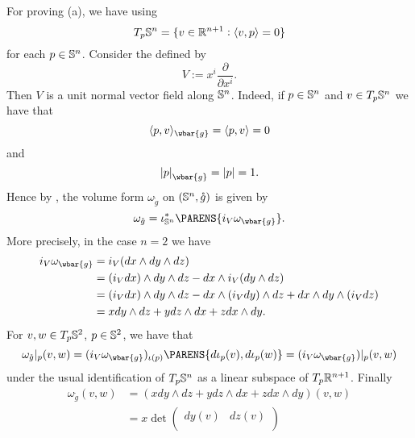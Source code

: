 \begin{solution}
	For proving (a), we have using \cite[117]{lee:smooth_manifolds:2013}
	\begin{equation*}
		T_p\Sbb^n = \cbr[0]{v \in \Rbb^{n + 1} : \langle v,p \rangle = 0}
	\end{equation*}
	\noindent for each $p \in \mathbb{S}^n$. Consider the  defined by
	\begin{equation*}
		V := x^i \frac{\partial}{\partial x^i}.
	\end{equation*}
	Then $V$ is a unit normal vector field along $\mathbb{S}^n$. Indeed, if $p \in \mathbb{S}^n$ and $v \in T_p\mathbb{S}^n$ we have that 
	\begin{equation*}
		\langle p,v \rangle_{\wbar{g}} = \langle p,v \rangle = 0
	\end{equation*}
	\noindent and
	\begin{equation*}
		\abs[0]{p}_{\wbar{g}} = \abs[0]{p} = 1.
	\end{equation*}
	Hence by \cite[390]{lee:smooth_manifolds:2013}, the volume form $\omega_{\mathring{g}}$ on $(\mathbb{S}^n,\mathring{g})$ is given by
	\begin{equation*}
		\omega_{\mathring{g}} = \iota_{\Sbb^n}^*\PARENS{i_V\omega_{\wbar{g}}}.
	\end{equation*}
	More precisely, in the case $n = 2$ we have
	\begin{align*}
		i_V\omega_{\wbar{g}} &= i_V(dx \wedge dy \wedge dz)\\
		&= (i_V dx) \wedge dy \wedge dz - dx \wedge i_V(dy \wedge dz)\\
		&= (i_V dx) \wedge dy \wedge dz - dx \wedge (i_V dy) \wedge dz + dx \wedge dy \wedge (i_V dz)\\
		&= x dy \wedge dz + y dz \wedge dx+ z dx \wedge dy.
	\end{align*}
	For $v,w \in T_p\mathbb{S}^2$, $p \in \mathbb{S}^2$, we have that
	\begin{equation*}
		\omega_{\mathring{g}}\vert_p(v,w) = (i_V\omega_{\wbar{g}})_{\iota(p)}\PARENS{d\iota_p(v),d\iota_p(w)} = (i_V\omega_{\wbar{g}})\vert_p(v,w) 
	\end{equation*}
	\noindent under the usual identification of $T_p\mathbb{S}^n$ as a linear subspace of $T_p\mathbb{R}^{n+1}$. Finally
	\begin{align*}
		\omega_{\mathring{g}}(v,w) &= (x dy \wedge dz + y dz \wedge dx+ z dx \wedge dy)(v,w)\\
		&= x \det\begin{pmatrix}
			dy(v) & dz(v)\\

\end{pmatrix}
\end{align*}
\end{solution}
